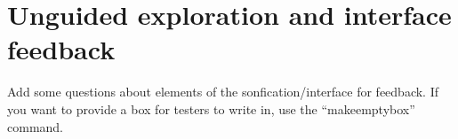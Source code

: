 \documentclass[12pt]{exam}
\begin{document}
\section*{Unguided exploration and interface feedback}
\begin{questions}
\question Add some questions about elements of the sonfication/interface for feedback. If you want to provide a box for testers to write in, use the ``makeemptybox'' command.
	\makeemptybox{2in}
\end{questions}
\end{document}
